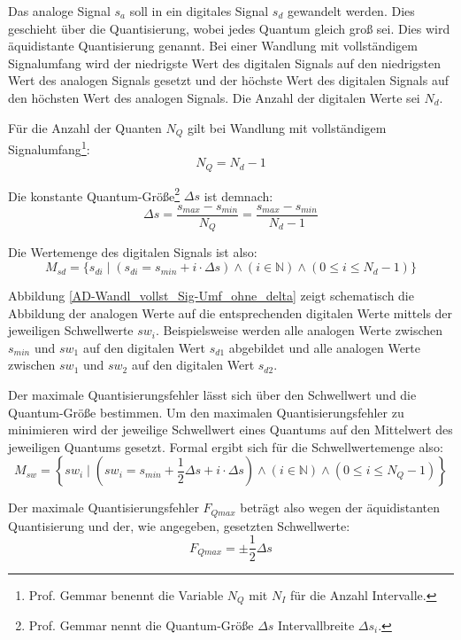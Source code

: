 \documentclass[11pt,a4paper]{scrreprt}
\begin{document}
Das analoge Signal $s_a$ soll in ein digitales Signal $s_d$ gewandelt werden. Dies geschieht über die Quantisierung, wobei jedes Quantum gleich groß sei. Dies wird äquidistante Quantisierung genannt. Bei einer Wandlung mit vollständigem Signalumfang wird der niedrigste Wert des digitalen Signals auf den niedrigsten Wert des analogen Signals gesetzt und der höchste Wert des digitalen Signals auf den höchsten Wert des analogen Signals. Die Anzahl der digitalen Werte sei $N_d$.

Für die Anzahl der Quanten $N_Q$ gilt bei Wandlung mit vollständigem Signalumfang\footnote{Prof. Gemmar benennt die Variable $N_Q$ mit $N_I$ für die Anzahl Intervalle.}:
\[ 
	N_Q = N_d - 1
\]

Die konstante Quantum-Größe\footnote{Prof. Gemmar nennt die Quantum-Größe $\Delta s$ Intervallbreite $\Delta s_i$.} $\Delta s$ ist demnach:
\[ 
	\Delta s = \frac { s_{max} - s_{min} } { N_Q } 
	         = \frac { s_{max} - s_{min} } { N_d - 1 }
\]

Die Wertemenge des digitalen Signals ist also:
\[ 
	M_{sd} =  \{ s_{di} \mid (s_{di} = s_{min} +  i \cdot \Delta s)
	                         \wedge (i \in \mathbb{N})
	                         \wedge (0 \le i \le N_d - 1)  \} 
\]

Abbildung \ref{AD-Wandl_vollst_Sig-Umf_ohne_delta} zeigt schematisch die Abbildung der analogen Werte auf die entsprechenden digitalen Werte mittels der jeweiligen Schwellwerte $sw_i$. Beispielsweise werden alle analogen Werte zwischen $s_{min}$ und $sw_1$ auf den digitalen Wert $s_{d1}$ abgebildet und alle analogen Werte zwischen $sw_1$ und $sw_2$ auf den digitalen Wert $s_{d2}$.

Der maximale Quantisierungsfehler lässt sich über den Schwellwert und die Quantum-Größe bestimmen. Um den maximalen Quantisierungsfehler zu minimieren wird der jeweilige Schwellwert eines Quantums auf den Mittelwert des jeweiligen Quantums gesetzt. Formal ergibt sich für die Schwellwertemenge also:
\[ 
	M_{sw} =  \left\{ sw_i \mid 
	                           \left(sw_i = s_{min} 
	                           + \frac{1}{2} \Delta s + i \cdot \Delta s\right)
                               \wedge (i \in \mathbb{N})
	                           \wedge (0 \le i \le N_Q - 1)  \right\}
\]

Der maximale Quantisierungsfehler $F_{Qmax}$ beträgt also wegen der äquidistanten Quantisierung und der, wie angegeben, gesetzten Schwellwerte:
\[ 
	F_{Qmax} = \pm \frac{1}{2} \Delta s
\]
\end{document}
